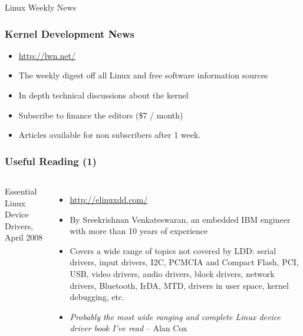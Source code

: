 \begin{frame}
  Linux Weekly News
  \frametitle{Kernel Development News}
  \begin{itemize}
  \item \url{http://lwn.net/}
  \item The weekly digest off all Linux and free software
    information sources
  \item In depth technical discussions about the kernel
  \item Subscribe to finance the editors (\$7 / month)
  \item Articles available for non subscribers after 1 week.
  \end{itemize}
\end{frame}

\begin{frame}
  \frametitle{Useful Reading (1)}
  \begin{columns}
    Essential Linux Device Drivers, April 2008
    \begin{itemize}
    \item \url{http://elinuxdd.com/}
    \item By Sreekrishnan Venkateswaran, an embedded IBM engineer
      with more than 10 years of experience
    \item Covers a wide range of topics not covered by LDD: serial
      drivers, input drivers, I2C, PCMCIA and Compact Flash, PCI,
      USB, video drivers, audio drivers, block drivers, network
      drivers, Bluetooth, IrDA, MTD, drivers in user space, kernel
      debugging, etc.
    \item \emph{Probably the most wide ranging and complete Linux
          device driver book I've read} -- Alan Cox
    \end{itemize}

\end{columns}
\end{frame}
